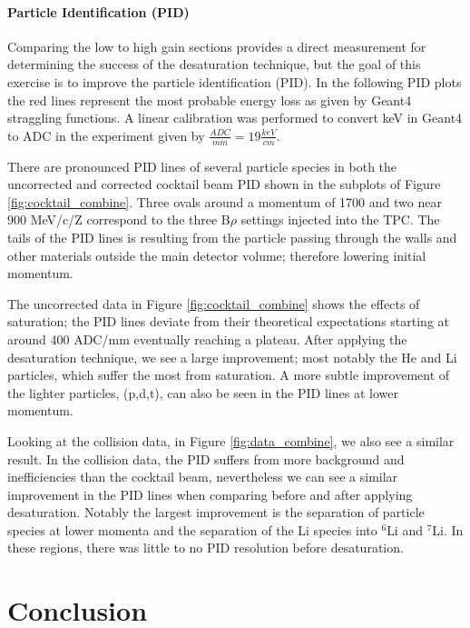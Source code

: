 \documentclass[review]{elsarticle}
\begin{document}
\paragraph{Particle Identification (PID)}


Comparing the low to high gain sections provides a direct measurement for determining the success of the desaturation technique, but the goal  of this exercise is to improve the particle identification (PID). In the following PID plots the red lines represent the most probable energy loss as given by Geant4 straggling functions. A linear calibration was performed to convert keV in Geant4 to ADC in the experiment given by $\frac{ADC}{mm} = 19 \frac{keV}{cm}$.

There are pronounced PID lines of several particle species in both the uncorrected and corrected cocktail beam PID shown in the subplots of Figure \ref{fig:cocktail_combine}. Three ovals around a momentum of 1700 and two near 900 MeV/c/Z correspond to the three B$\rho$ settings injected into the TPC. The tails of the PID lines is resulting from the particle passing through the walls and other materials outside the main detector volume; therefore lowering initial momentum. 

The uncorrected data in Figure \ref{fig:cocktail_combine} shows the effects of saturation; the PID lines deviate from their theoretical expectations starting at around 400 ADC/mm eventually reaching a plateau. After applying the desaturation technique, we see a large improvement; most notably the He and Li particles, which suffer the most from saturation. A more subtle improvement of the lighter particles, (p,d,t), can also be seen in the PID lines at lower momentum.

Looking at the collision data, in Figure \ref{fig:data_combine}, we also see a similar result. In the collision data, the PID suffers from more background and inefficiencies than the cocktail beam, nevertheless we can see a similar improvement in the PID lines when comparing before and after applying desaturation. Notably the largest improvement is the separation of particle species at lower momenta and the separation of the Li species into ${}^{6}$Li and ${}^{7}$Li. In these regions, there was little to no PID resolution before desaturation. 

\clearpage

\section{Conclusion}
\end{document}
